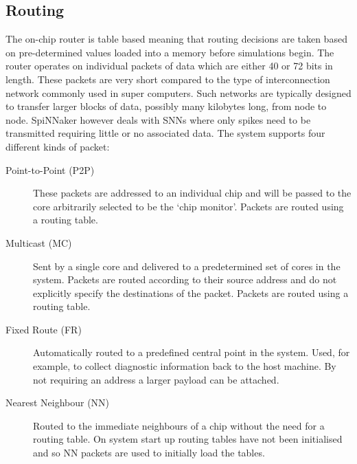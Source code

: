 		\subsection{Routing}
			
			
			The on-chip router is table based meaning that routing decisions are taken
			based on pre-determined values loaded into a memory before simulations
			begin. The router operates on individual packets of data which are either
			40 or 72 bits in length. These packets are very short compared to the type
			of interconnection network commonly used in super computers. Such networks
			are typically designed to transfer larger blocks of data, possibly many
			kilobytes long, from node to node. SpiNNaker however deals with SNNs where
			only spikes need to be transmitted requiring little or no associated data.
			The system supports four different kinds of packet:
			
			\begin{description}
				
				\item[Point-to-Point (P2P)] These packets are addressed to an individual
				chip and will be passed to the core arbitrarily selected to be the `chip
				monitor'. Packets are routed using a routing table.
				
				\item[Multicast (MC)] Sent by a single core and delivered to a
				predetermined set of cores in the system. Packets are routed according
				to their source address and do not explicitly specify the destinations
				of the packet. Packets are routed using a routing table.
				
				\item[Fixed Route (FR)] Automatically routed to a predefined central
				point in the system. Used, for example, to collect diagnostic
				information back to the host machine. By not requiring an address a
				larger payload can be attached.
				
				\item[Nearest Neighbour (NN)] Routed to the immediate neighbours of a
				chip without the need for a routing table. On system start up routing
				tables have not been initialised and so NN packets are used to initially
				load the tables.
				
			\end{description}
			
